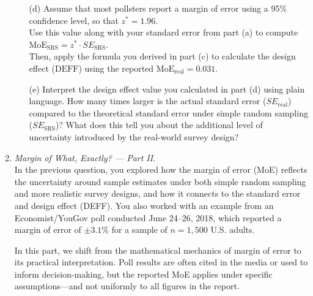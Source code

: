 \documentclass{article}
\begin{document}
\begin{enumerate}
\begin{enumerate}
        \item[(d)] Assume that most pollsters report a margin of error using a 95\% confidence level, so that \( z^* = 1.96 \). \\
        Use this value along with your standard error from part (a) to compute \( \text{MoE}_{\text{SRS}} = z^* \cdot SE_{\text{SRS}} \). \\
        Then, apply the formula you derived in part (c) to calculate the design effect (\( \text{DEFF} \)) using the reported \( \text{MoE}_{\text{real}} = 0.031 \).

        \item[(e)] Interpret the design effect value you calculated in part (d) using plain language. How many times larger is the actual standard error ($SE_{\text{real}}$) compared to the theoretical standard error under simple random sampling ($SE_{\text{SRS}}$)? What does this tell you about the additional level of uncertainty introduced by the real-world survey design?

    \end{enumerate}

\item  \emph{Margin of What, Exactly? — Part II}. \\
    In the previous question, you explored how the margin of error (MoE) reflects the uncertainty around sample estimates under both simple random sampling and more realistic survey designs, and how it connects to the standard error and design effect (DEFF). You also worked with an example from an Economist/YouGov poll conducted June 24–26, 2018, which reported a margin of error of $\pm 3.1\%$ for a sample of $n = 1{,}500$ U.S. adults.
    
    In this part, we shift from the mathematical mechanics of margin of error to its practical interpretation. Poll results are often cited in the media or used to inform decision-making, but the reported MoE applies under specific assumptions—and not uniformly to all figures in the report.
    

\end{enumerate}
\end{document}
